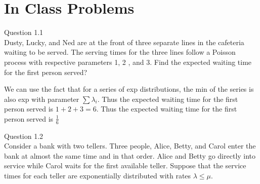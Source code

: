 \documentclass[answers,12pt,addpoints]{exam}
\begin{document}
\section*{In Class Problems}
\begin{questions}
    \question Question 1.1\\
    Dusty, Lucky, and Ned are at the front of three separate lines in the cafeteria waiting to be served. The serving times for the three lines follow a Poisson process with respective parameters 1, 2 , and 3. Find the expected waiting time for the first person served?
\begin{solution}
    We can use the fact that for a series of exp distributions, the min of the series is also exp with parameter $\sum \lambda_i$. Thus the expected waiting time for the first person served is ${1+2+3} = {6}$. Thus the expected waiting time for the first person served is $\frac{1}{6}$
\end{solution}
    \question Question 1.2\\
    Consider a bank with two tellers. Three people, Alice, Betty, and Carol enter the bank at almost the same
    time and in that order. Alice and Betty go directly into service while Carol waits for the first available
    teller. Suppose that the service times for each teller are exponentially distributed with rates $\lambda \leq \mu$.
    \begin{solution}
\end{solution}
\end{questions}
\end{document}
